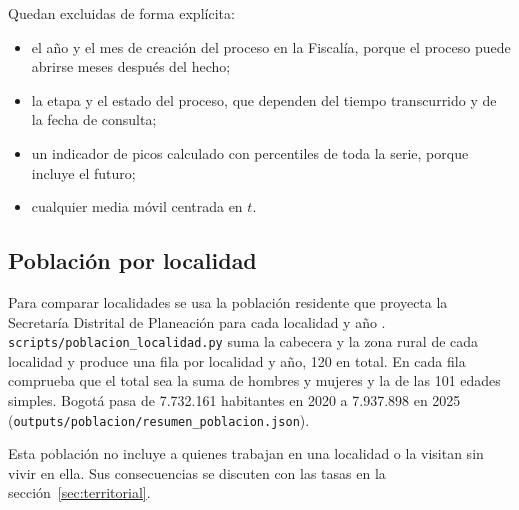 Quedan excluidas de forma explícita:
\begin{itemize}
  \item el año y el mes de creación del proceso en la Fiscalía, porque el proceso puede abrirse meses después del hecho;
  \item la etapa y el estado del proceso, que dependen del tiempo transcurrido y de la fecha de consulta;
  \item un indicador de picos calculado con percentiles de toda la serie, porque incluye el futuro;
  \item cualquier media móvil centrada en $t$.
\end{itemize}

\subsection{Población por localidad}\label{sec:poblacion}

Para comparar localidades se usa la población residente que proyecta la Secretaría Distrital de Planeación para cada localidad y año \citep{sdp2025}. \texttt{scripts/poblacion\_localidad.py} suma la cabecera y la zona rural de cada localidad y produce una fila por localidad y año, 120 en total. En cada fila comprueba que el total sea la suma de hombres y mujeres y la de las 101 edades simples. Bogotá pasa de 7.732.161 habitantes en 2020 a 7.937.898 en 2025 (\texttt{outputs/poblacion/resumen\_poblacion.json}).

Esta población no incluye a quienes trabajan en una localidad o la visitan sin vivir en ella. Sus consecuencias se discuten con las tasas en la sección~\ref{sec:territorial}.
